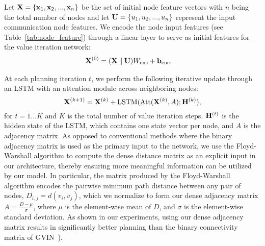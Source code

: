 Let $\mathbf{X} = \{\mathbf{x}_1, \mathbf{x}_2, ... , \mathbf{x}_n\}$ be the set of initial node feature vectors with $n$ being the
total number of nodes and let $\mathbf{U} = \{u_1, u_2, ... , u_n\}$ represent the input communication node features.
We encode the node input features (see Table~\ref{tab:node_feature}) through a linear layer to serve as
initial features for the value iteration network:
\begin{align}
\mathbf{X}^{(0)} &= (\mathbf{X} \mathbin\Vert \mathbf{U}) W_{\mathrm{enc}} + \mathbf{b}_\mathrm{enc}.
\end{align}



At each planning iteration $t$, we perform the following iterative update through an LSTM with an
attention module across neighboring nodes:
\begin{equation}
  \mathbf{X}^{(k+1)} = \mathbf{X}^{(k)} + \mathop{\mathrm{LSTM}}(\mathrm{Att}(\mathbf{X}^{(k)}, A); \mathbf{H}^{(k)}),
\end{equation}
for $t=1 \dots K$ and $K$ is the total number of value iteration steps. $\mathbf{H}^{(t)}$ is the hidden
state of the LSTM, which contains one state vector per node, and $A$ is the adjacency matrix.
As opposed to conventional methods where the binary adjacency matrix is used as the primary input to
the network, we use the Floyd-Warshall algorithm to compute the dense
distance matrix as an explicit input in our architecture, thereby ensuring
more meaningful information can be utilized by our model. In particular, the matrix produced by the Floyd-Warshall
algorithm encodes the pairwise minimum path
distance between any pair of nodes, $D_{i,j} = d(v_i,v_j)$, which we normalize to form our dense
adjacency matrix %
$A = \frac{D - \mu}{\sigma}$, where $\mu$ is the element-wise mean of $D$, and
$\sigma$ is the element-wise standard deviation. As shown in our experiments, using our dense adjacency
matrix results in significantly better planning than the binary connectivity matrix of GVIN~\cite{gvin}).

